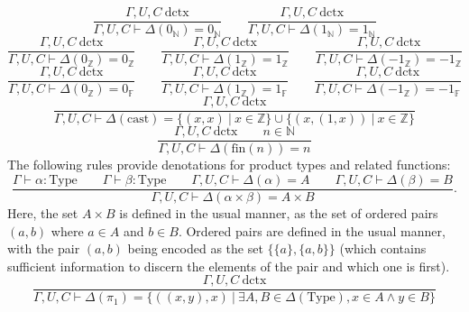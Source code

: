 \documentclass[11pt]{article}
\begin{document}
\begin{equation}
	\frac{\Gamma,U,C\ \text{dctx}}
	{\Gamma,U,C \vdash \Delta(0_{\mathbb{N}}) = 0_{\mathbb{N}}}
	\qquad
	\frac{\Gamma,U,C\ \text{dctx}}
	{\Gamma,U,C \vdash \Delta(1_{\mathbb{N}}) = 1_{\mathbb{N}}}
\end{equation}
\begin{equation}
	\frac{\Gamma,U,C\ \text{dctx}}
	{\Gamma,U,C \vdash \Delta(0_{\mathbb{Z}}) = 0_{\mathbb{Z}}}
	\qquad
	\frac{\Gamma,U,C\ \text{dctx}}
	{\Gamma,U,C \vdash \Delta(1_{\mathbb{Z}}) = 1_{\mathbb{Z}}}
	\qquad
	\frac{\Gamma,U,C\ \text{dctx}}
	{\Gamma,U,C \vdash \Delta(-1_{\mathbb{Z}}) = -1_{\mathbb{Z}}}
\end{equation}
\begin{equation}
	\frac{\Gamma,U,C\ \text{dctx}}
	{\Gamma,U,C \vdash \Delta(0_{\mathbb{Z}}) = 0_{\mathbb{F}}}
	\qquad
	\frac{\Gamma,U,C\ \text{dctx}}
	{\Gamma,U,C \vdash \Delta(1_{\mathbb{Z}}) = 1_{\mathbb{F}}}
	\qquad
	\frac{\Gamma,U,C\ \text{dctx}}
	{\Gamma,U,C \vdash \Delta(-1_{\mathbb{Z}}) = -1_{\mathbb{F}}}
\end{equation}
\begin{equation}
	\frac{\Gamma,U,C\ \text{dctx}}
	{\Gamma,U,C \vdash \Delta(\text{cast}) =
	\{(x,x)\ |\ x \in \mathbb{Z}\} \cup
	\{(x,(1,x))\ |\ x \in \mathbb{Z}\}}
\end{equation}
\begin{equation}
	\frac{\Gamma,U,C\ \text{dctx}
	\qquad n \in \mathbb{N}}
	{\Gamma,U,C \vdash \Delta(\text{fin}(n)) = n}
\end{equation}
The following rules provide denotations for product types and
related functions:
\begin{equation}
	\frac{\Gamma \vdash \alpha : \text{Type}
	\qquad \Gamma \vdash \beta : \text{Type}
	\qquad \Gamma,U,C \vdash \Delta(\alpha) = A
	\qquad \Gamma,U,C \vdash \Delta(\beta) = B}
	{\Gamma,U,C \vdash \Delta(\alpha \times \beta) = A \times B}.
\end{equation}
Here, the set $A \times B$ is defined in the usual manner, as the
set of ordered pairs $(a,b)$ where $a \in A$ and $b \in B$.
Ordered pairs are defined in the usual manner, with the pair
$(a,b)$ being encoded as the set $\{\{a\},\{a,b\}\}$
(which contains sufficient information to discern the elements of the pair and which one is first).
\begin{equation}
	\frac{\Gamma,U,C\ \text{dctx}}
	{\Gamma,U,C \vdash \Delta(\pi_1) =
	\{((x,y),x)\ |\ \exists A, B \in \Delta(\text{Type}),
	x \in A \wedge y \in B\}}
\end{equation}
\end{document}
